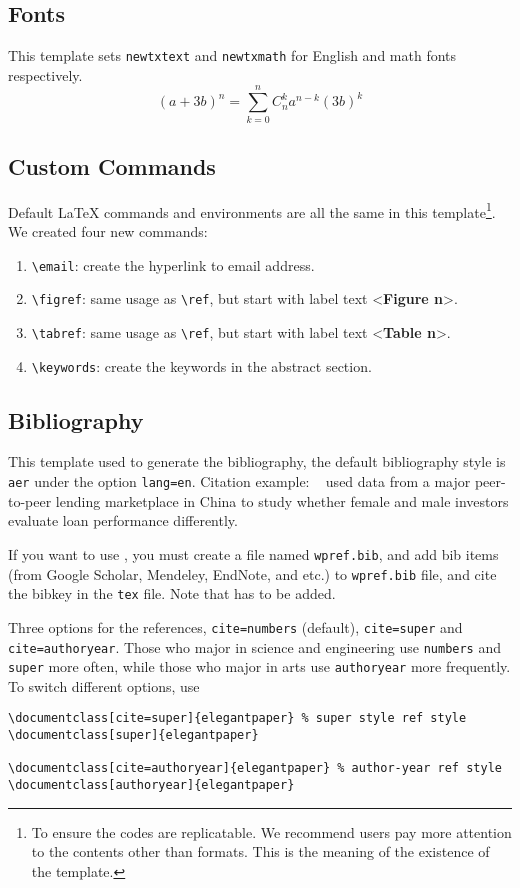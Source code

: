 \documentclass[11pt,en,authoryear]{elegantpaper}
\begin{document}
\subsection{Fonts}
This template sets \lstinline{newtxtext} and \lstinline{newtxmath} for English and math fonts respectively.
\begin{equation}
(a+3b)^{n} = \sum_{k=0}^{n} C_{n}^{k} a^{n-k} (3b)^k\label{eq:binom}
\end{equation}

\subsection{Custom Commands}
Default \LaTeX{} commands and environments are all the same in this template\footnote{To ensure the codes are replicatable. We recommend users pay more attention to the contents other than formats. This is the meaning of the existence of the template.}. We created four new commands:
\begin{enumerate}
	\item \lstinline{\email}: create the hyperlink to email address.
	\item \lstinline{\figref}: same usage as \lstinline{\ref}, but start with label text <\textbf{Figure n}>.
	\item \lstinline{\tabref}: same usage as \lstinline{\ref}, but start with label text <\textbf{Table n}>.
	\item \lstinline{\keywords}: create the keywords in the abstract section.
\end{enumerate}


\subsection{Bibliography}
This template used  to generate the bibliography, the default bibliography style is  \lstinline{aer} under the option \lstinline{lang=en}. Citation example: ~\cite{en3} used data from a major peer-to-peer lending marketplace in China to study whether female and male investors evaluate loan performance differently. 

If you want to use , you must create a file named \lstinline{wpref.bib}, and add bib items (from Google Scholar, Mendeley, EndNote, and etc.) to \lstinline{wpref.bib} file, and cite the bibkey in the \lstinline{tex} file. Note that  has to be added.

Three options for the references, \lstinline{cite=numbers} (default), \lstinline{cite=super} and \lstinline{cite=authoryear}. Those who major in science and engineering use \lstinline{numbers} and \lstinline{super} more often, while those who major in arts use \lstinline{authoryear} more frequently. To switch different options, use
\begin{lstlisting}
\documentclass[cite=super]{elegantpaper} % super style ref style
\documentclass[super]{elegantpaper}

\documentclass[cite=authoryear]{elegantpaper} % author-year ref style
\documentclass[authoryear]{elegantpaper}
\end{lstlisting}
\end{document}
